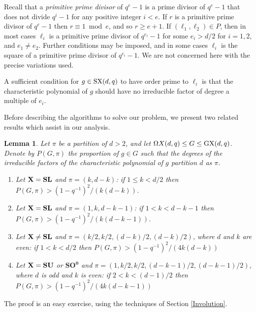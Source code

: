\documentclass[12pt]{article}
\newtheorem{lemma}[definition]{Lemma}
\def\SX{{\rm SX}}
\def\GX{{\rm GX}}
\def\X{{\rm X}}
\def\X{{\bf X}}
\begin{document}
Recall that 
a {\it primitive prime divisor} of $q^e-1$ is a prime divisor of
$q^e-1$ that does not divide $q^i-1$ for any positive integer $i<e$.  
If $r$ is a primitive prime divisor of $q^e-1$ then $r\equiv 1\bmod e$, 
and so $r\ge e+1$.  If $(\ell_1,\ell_2)\in P$, then in most cases $\ell_i$ is
a primitive prime divisor of $q^{e_i}-1$ for some $e_i>d/2$ for $i=1,2$, and
$e_1\ne e_2$.  Further conditions may be imposed, and in some cases
$\ell_i$ is the square of a primitive prime divisor of $q^{e_i}-1$.
 We are not concerned here with the precise variations used. 

A sufficient condition for 
$g \in \SX(d,q)$ to have order prime to $\ell_i$ is 
that the characteristic polynomial of $g$ should have no irreducible
factor of degree a multiple of $e_i$. 

Before describing the algorithms to solve our problem, 
we present two related results which assist in our analysis.

\begin{lemma}\label{partition}
Let $\pi$ be a partition of $d > 2$,
and let $\Omega X(d,q)\le G\le\GX(d,q)$. 
Denote by $P(G,\pi)$ the proportion of $g\in G$ such that the
degrees of the irreducible factors of the characteristic polynomial of $g$
partition $d$ as $\pi$.  
\begin{enumerate}
\item[\rm (i)] Let $\X=\mathbf{SL}$ and $\pi=(k, d-k)$:
if $1\le k<d/2$ then $P(G,\pi)>(1-q^{-1})^2/(k(d-k))$.

\item[\rm (ii)] 
Let $\X=\mathbf{SL}$ and $\pi=(1, k, d-k-1)$:
if $1<k<d-k-1$ then $P(G,\pi)>(1-q^{-1})^2/(k(d-k-1))$.

\item[\rm (iii)] 
Let $\X\ne\mathbf{SL}$ and $\pi=(k/2,k/2,(d-k)/2,(d-k)/2)$, where $d$ and $k$ 
are even:
if $1<k<d/2$ then  $P(G,\pi)>(1-q^{-1})^2/(4k(d-k))$

\item[\rm (iv)] 
Let $\X=\mathbf{SU}$ or $\mathbf{SO^0}$ and
$\pi=(1,k/2,k/2, (d-k-1)/2,(d-k-1)/2)$, where
$d$ is odd and $k$ is even:
if $2<k<(d-1)/2$ then  $P(G,\pi)>(1-q^{-1})^2/(4k(d-k-1))$
\end{enumerate}
\end{lemma}
The proof is an easy exercise, using the techniques of 
Section \ref{Involution}.
\end{document}
